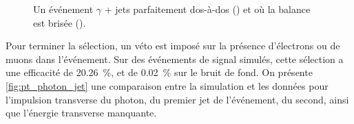 \begin{figure}[tbp]
{{}}
  \caption{Un événement $\gamma$ + jets parfaitement dos-à-dos () et où la balance est brisée ().}
  \label{fig:schema_g_jet}
\end{figure}

Pour terminer la sélection, un véto est imposé sur la présence d'électrons ou de muons dans l'événement. Sur des événements de signal simulés, cette sélection a une efficacité de \SI{20.26}{\%}, et de \SI{0.02}{\%} sur le bruit de fond. On présente \cref{fig:pt_photon_jet} une comparaison entre la simulation et les données pour l'impulsion transverse du photon, du premier jet de l'événement, du second, ainsi que l'énergie transverse manquante.

